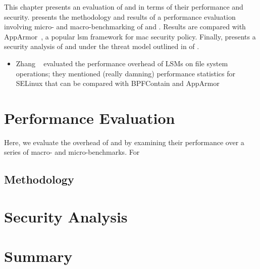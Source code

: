 This chapter presents an evaluation of \bpfbox{} and \bpfcontain{} in terms of their
performance and security.  presents the methodology and results
of a performance evaluation involving micro- and macro-benchmarking of \bpfbox{} and
\bpfcontain{}. Results are compared with AppArmor~\cite{cowan2000_apparmor}, a popular
\gls{lsm} framework for \gls{mac} security policy. Finally, 
presents a security analysis of \bpfbox{} and \bpfcontain{} under the threat model
outlined in  of .

\begin{inprogress}
  \begin{itemize}
    \item Zhang \etal~\cite{zhang2021_lsm_file_overhead} evaluated the performance
    overhead of LSMs on file system operations; they mentioned (really damning) performance
    statistics for SELinux that can be compared with BPFContain and AppArmor
  \end{itemize}
\end{inprogress}

\section{Performance Evaluation}%
\label{s:eval-performance}

Here, we evaluate the overhead of \bpfbox{} and \bpfcontain by examining their performance
over a series of macro- and micro-benchmarks. For

\subsection{Methodology}%
\label{ss:performance-methodology}



\section{Security Analysis}%
\label{s:eval-security}



\section{Summary}%
\label{s:eval-summary}
